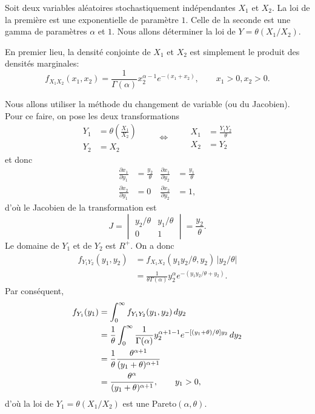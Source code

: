 \documentclass[11pt,article]{memoir}
\begin{document}
Soit deux variables aléatoires stochastiquement indépendantes $X_1$ et
$X_2$. La loi de la première est une exponentielle de paramètre $1$.
Celle de la seconde est une gamma de paramètres $\alpha$ et $1$. Nous
allons déterminer la loi de $Y = \theta (X_1/X_2)$.

En premier lieu, la densité conjointe de $X_1$ et $X_2$ est
simplement le produit des densités marginales:
\begin{equation*}
  f_{X_1 X_2}(x_1, x_2) = \frac{1}{\Gamma(\alpha)}
  x_2^{\alpha - 1} e^{-(x_1 + x_2)}, \qquad
  x_1 > 0, x_2 > 0.
\end{equation*}

Nous allons utiliser la méthode du changement de variable (ou du
Jacobien). Pour ce faire, on pose les deux transformations
\begin{equation*}
  \begin{aligned}
    Y_1 &= \theta \left( \frac{X_1}{X_2} \right) \\
    Y_2 &= X_2
  \end{aligned}
  \qquad \Leftrightarrow \qquad
  \begin{aligned}
    X_1 &= \frac{Y_1 Y_2}{\theta} \\
    X_2 &= Y_2
  \end{aligned}
\end{equation*}
et donc
\begin{align*}
  \frac{\partial x_1}{\partial y_1} &= \frac{y_2}{\theta} &
  \frac{\partial x_1}{\partial y_2} &= \frac{y_1}{\theta} \\
  \frac{\partial x_2}{\partial y_1} &= 0 &
  \frac{\partial x_2}{\partial y_2} &= 1,
\end{align*}
d'où le Jacobien de la transformation est
\begin{equation*}
  J =
  \begin{vmatrix}
    y_2/\theta & y_1/\theta \\
    0 & 1
  \end{vmatrix}
  = \frac{y_2}{\theta}.
\end{equation*}
Le domaine de $Y_1$ et de $Y_2$ est $R^+$. On a donc
\begin{align*}
  f_{Y_1 Y_2}(y_1, y_2)
  &= f_{X_1 X_2}(y_1 y_2/\theta, y_2)\, \lvert y_2/\theta \rvert \\
  &= \frac{1}{\theta \Gamma(\alpha)} y_2^\alpha
    e^{-(y_1 y_2/\theta + y_2)}.
\end{align*}
Par conséquent,
\begin{align*}
  f_{Y_1}(y_1)
  &= \int_0^\infty f_{Y_1 Y_2}(y_1, y_2)\, dy_2 \\
  &= \frac{1}{\theta} \int_0^\infty
    \frac{1}{\Gamma(\alpha)} y_2^{\alpha + 1 - 1}
    e^{-[(y_1 + \theta)/\theta] y_2}\, dy_2 \\
  &= \frac{1}{\theta}
    \frac{\theta^{\alpha + 1}}{(y_1 + \theta)^{\alpha + 1}} \\
  &= \frac{\theta^\alpha}{%
    (y_1 + \theta)^{\alpha + 1}}, \qquad y_1 > 0,
\end{align*}
d'où la loi de $Y_1 = \theta (X_1/X_2)$ est une Pareto$(\alpha, \theta)$.
\end{document}
